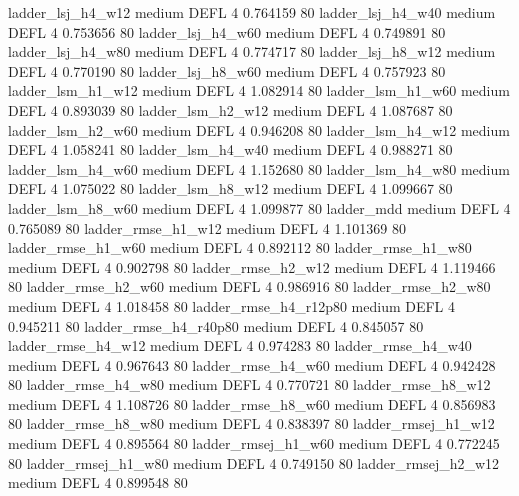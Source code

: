     ladder_lsj_h4_w12     medium     DEFL                 4 0.764159 80
     ladder_lsj_h4_w40     medium     DEFL                 4 0.753656 80
     ladder_lsj_h4_w60     medium     DEFL                 4 0.749891 80
     ladder_lsj_h4_w80     medium     DEFL                 4 0.774717 80
     ladder_lsj_h8_w12     medium     DEFL                 4 0.770190 80
     ladder_lsj_h8_w60     medium     DEFL                 4 0.757923 80
     ladder_lsm_h1_w12     medium     DEFL                 4 1.082914 80
     ladder_lsm_h1_w60     medium     DEFL                 4 0.893039 80
     ladder_lsm_h2_w12     medium     DEFL                 4 1.087687 80
     ladder_lsm_h2_w60     medium     DEFL                 4 0.946208 80
     ladder_lsm_h4_w12     medium     DEFL                 4 1.058241 80
     ladder_lsm_h4_w40     medium     DEFL                 4 0.988271 80
     ladder_lsm_h4_w60     medium     DEFL                 4 1.152680 80
     ladder_lsm_h4_w80     medium     DEFL                 4 1.075022 80
     ladder_lsm_h8_w12     medium     DEFL                 4 1.099667 80
     ladder_lsm_h8_w60     medium     DEFL                 4 1.099877 80
            ladder_mdd     medium     DEFL                 4 0.765089 80
    ladder_rmse_h1_w12     medium     DEFL                 4 1.101369 80
    ladder_rmse_h1_w60     medium     DEFL                 4 0.892112 80
    ladder_rmse_h1_w80     medium     DEFL                 4 0.902798 80
    ladder_rmse_h2_w12     medium     DEFL                 4 1.119466 80
    ladder_rmse_h2_w60     medium     DEFL                 4 0.986916 80
    ladder_rmse_h2_w80     medium     DEFL                 4 1.018458 80
 ladder_rmse_h4_r12p80     medium     DEFL                 4 0.945211 80
 ladder_rmse_h4_r40p80     medium     DEFL                 4 0.845057 80
    ladder_rmse_h4_w12     medium     DEFL                 4 0.974283 80
    ladder_rmse_h4_w40     medium     DEFL                 4 0.967643 80
    ladder_rmse_h4_w60     medium     DEFL                 4 0.942428 80
    ladder_rmse_h4_w80     medium     DEFL                 4 0.770721 80
    ladder_rmse_h8_w12     medium     DEFL                 4 1.108726 80
    ladder_rmse_h8_w60     medium     DEFL                 4 0.856983 80
    ladder_rmse_h8_w80     medium     DEFL                 4 0.838397 80
   ladder_rmsej_h1_w12     medium     DEFL                 4 0.895564 80
   ladder_rmsej_h1_w60     medium     DEFL                 4 0.772245 80
   ladder_rmsej_h1_w80     medium     DEFL                 4 0.749150 80
   ladder_rmsej_h2_w12     medium     DEFL                 4 0.899548 80
